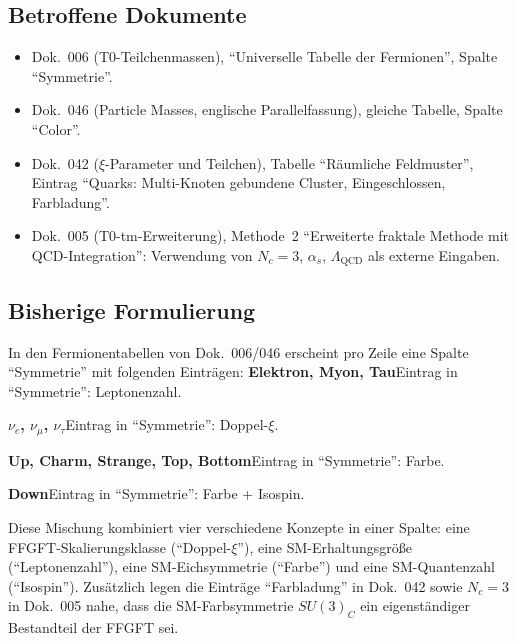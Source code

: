 \subsection*{Betroffene Dokumente}

\begin{itemize}
  \item Dok.~006 (T0-Teilchenmassen), \enquote{Universelle Tabelle der
        Fermionen}, Spalte \enquote{Symmetrie}.
  \item Dok.~046 (Particle Masses, englische Parallelfassung), gleiche
        Tabelle, Spalte \enquote{Color}.
  \item Dok.~042 ($\xi$-Parameter und Teilchen), Tabelle
        \enquote{Räumliche Feldmuster}, Eintrag
        \enquote{Quarks: Multi-Knoten gebundene Cluster, Eingeschlossen, Farbladung}.
  \item Dok.~005 (T0-tm-Erweiterung), Methode~2 \enquote{Erweiterte
        fraktale Methode mit QCD-Integration}: Verwendung von
        $N_c = 3$, $\alpha_s$, $\Lambda_{\text{QCD}}$ als
        externe Eingaben.
\end{itemize}

\subsection*{Bisherige Formulierung}

In den Fermionentabellen von Dok.~006/046 erscheint pro Zeile eine
Spalte \enquote{Symmetrie} mit folgenden Einträgen:
\smallskip\noindent \textbf{Elektron, Myon, Tau}\quad Eintrag in \enquote{Symmetrie}: Leptonenzahl.

\smallskip\noindent \textbf{$\nu_e$, $\nu_\mu$, $\nu_\tau$}\quad Eintrag in \enquote{Symmetrie}: Doppel-$\xi$.

\smallskip\noindent \textbf{Up, Charm, Strange, Top, Bottom}\quad Eintrag in \enquote{Symmetrie}: Farbe.

\smallskip\noindent \textbf{Down}\quad Eintrag in \enquote{Symmetrie}: Farbe + Isospin.

\medskip


Diese Mischung kombiniert vier verschiedene Konzepte in einer Spalte:
eine FFGFT-Skalierungsklasse (\enquote{Doppel-$\xi$}), eine
SM-Erhaltungsgröße (\enquote{Leptonenzahl}), eine SM-Eichsymmetrie
(\enquote{Farbe}) und eine SM-Quantenzahl (\enquote{Isospin}).
Zusätzlich legen die Einträge \enquote{Farbladung} in Dok.~042 sowie
$N_c = 3$ in Dok.~005 nahe, dass die SM-Farbsymmetrie $SU(3)_C$ ein
eigenständiger Bestandteil der FFGFT sei.

